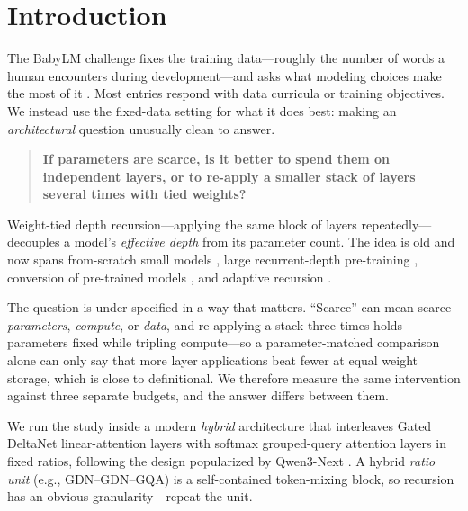 \documentclass[11pt]{article}
\begin{document}
\section{Introduction}

The BabyLM challenge fixes the training data---roughly the number of words a human encounters during development---and asks what modeling choices make the most of it \citep{babylm2026cfp}. Most entries respond with data curricula or training objectives. We instead use the fixed-data setting for what it does best: making an \emph{architectural} question unusually clean to answer.

\begin{quote}
\textbf{If parameters are scarce, is it better to spend them on independent layers, or to re-apply a smaller stack of layers several times with tied weights?}
\end{quote}

Weight-tied depth recursion---applying the same block of layers repeatedly---decouples a model's \emph{effective depth} from its parameter count. The idea is old \citep{dehghani2019universal,lan2020albert} and now spans from-scratch small models \citep{liu2024mobilellm}, large recurrent-depth pre-training \citep{geiping2025recurrent}, conversion of pre-trained models \citep{bae2024relaxed}, and adaptive recursion \citep{bae2025mor}.

The question is under-specified in a way that matters. ``Scarce'' can mean scarce \emph{parameters}, \emph{compute}, or \emph{data}, and re-applying a stack three times holds parameters fixed while tripling compute---so a parameter-matched comparison alone can only say that more layer applications beat fewer at equal weight storage, which is close to definitional. We therefore measure the same intervention against three separate budgets, and the answer differs between them.

We run the study inside a modern \emph{hybrid} architecture that interleaves Gated DeltaNet linear-attention layers \citep{yang2025gateddeltanet} with softmax grouped-query attention layers \citep{ainslie2023gqa} in fixed ratios, following the design popularized by Qwen3-Next \citep{qwen2025next}. A hybrid \emph{ratio unit} (e.g., GDN--GDN--GQA) is a self-contained token-mixing block, so recursion has an obvious granularity---repeat the unit.
\end{document}
